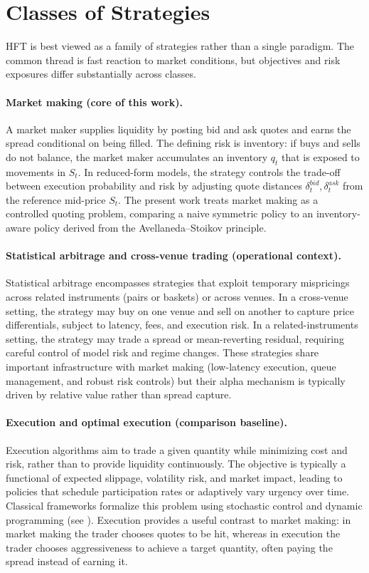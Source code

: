 \documentclass[a4paper,10pt,titlepage,oneside,openany]{book}
\providecommand{\textcite}[1]{\cite{#1}}
\theoremstyle{plain}\newtheorem{theorem}{Theorem}[chapter]
\theoremstyle{definition}\newtheorem{definition}{Definition}[chapter]
\theoremstyle{remark}\newtheorem{remark}{Remark}[chapter]
\begin{document}
\section{Classes of Strategies}
HFT is best viewed as a family of strategies rather than a single paradigm. The common thread is fast reaction to market conditions, but objectives and risk exposures differ substantially across classes.

\paragraph{Market making (core of this work).}
A market maker supplies liquidity by posting bid and ask quotes and earns the spread conditional on being filled. The defining risk is inventory: if buys and sells do not balance, the market maker accumulates an inventory $q_t$ that is exposed to movements in $S_t$. In reduced-form models, the strategy controls the trade-off between execution probability and risk by adjusting quote distances $\delta_t^{bid},\delta_t^{ask}$ from the reference mid-price $S_t$. The present work treats market making as a controlled quoting problem, comparing a naive symmetric policy to an inventory-aware policy derived from the Avellaneda--Stoikov principle.

\paragraph{Statistical arbitrage and cross-venue trading (operational context).}
Statistical arbitrage encompasses strategies that exploit temporary mispricings across related instruments (pairs or baskets) or across venues. In a cross-venue setting, the strategy may buy on one venue and sell on another to capture price differentials, subject to latency, fees, and execution risk. In a related-instruments setting, the strategy may trade a spread or mean-reverting residual, requiring careful control of model risk and regime changes. These strategies share important infrastructure with market making (low-latency execution, queue management, and robust risk controls) but their alpha mechanism is typically driven by relative value rather than spread capture.

\paragraph{Execution and optimal execution (comparison baseline).}
Execution algorithms aim to trade a given quantity while minimizing cost and risk, rather than to provide liquidity continuously. The objective is typically a functional of expected slippage, volatility risk, and market impact, leading to policies that schedule participation rates or adaptively vary urgency over time. Classical frameworks formalize this problem using stochastic control and dynamic programming (see \textcite{CarteaJaimungalPenalva2015}). Execution provides a useful contrast to market making: in market making the trader chooses quotes to be hit, whereas in execution the trader chooses aggressiveness to achieve a target quantity, often paying the spread instead of earning it.
\end{document}
